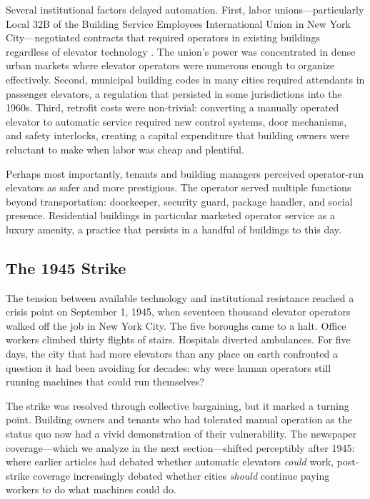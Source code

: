 \documentclass[12pt]{article}
\begin{document}
Several institutional factors delayed automation. First, labor unions---particularly Local 32B of the Building Service Employees International Union in New York City---negotiated contracts that required operators in existing buildings regardless of elevator technology \citep{gray2013}. The union's power was concentrated in dense urban markets where elevator operators were numerous enough to organize effectively. Second, municipal building codes in many cities required attendants in passenger elevators, a regulation that persisted in some jurisdictions into the 1960s. Third, retrofit costs were non-trivial: converting a manually operated elevator to automatic service required new control systems, door mechanisms, and safety interlocks, creating a capital expenditure that building owners were reluctant to make when labor was cheap and plentiful.

Perhaps most importantly, tenants and building managers perceived operator-run elevators as safer and more prestigious. The operator served multiple functions beyond transportation: doorkeeper, security guard, package handler, and social presence. Residential buildings in particular marketed operator service as a luxury amenity, a practice that persists in a handful of buildings to this day.

\subsection{The 1945 Strike}

The tension between available technology and institutional resistance reached a crisis point on September 1, 1945, when seventeen thousand elevator operators walked off the job in New York City. The five boroughs came to a halt. Office workers climbed thirty flights of stairs. Hospitals diverted ambulances. For five days, the city that had more elevators than any place on earth confronted a question it had been avoiding for decades: why were human operators still running machines that could run themselves?

The strike was resolved through collective bargaining, but it marked a turning point. Building owners and tenants who had tolerated manual operation as the status quo now had a vivid demonstration of their vulnerability. The newspaper coverage---which we analyze in the next section---shifted perceptibly after 1945: where earlier articles had debated whether automatic elevators \emph{could} work, post-strike coverage increasingly debated whether cities \emph{should} continue paying workers to do what machines could do.
\end{document}
